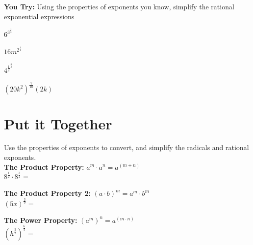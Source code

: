 \documentclass[12pt]{article}
\begin{document}
\hrulefill

\textbf{You Try:} Using the properties of exponents you know, simplify the rational exponential expressions

\begin{enumerate}[resume]
\begin{multicols}{2}

\item $6^{3^{\frac{1}{3}}}$\\

\item $16m^{2^{\frac{1}{4}}}$\\

\item $4^{\frac{1}{2}^{\frac{3}{5}}}$\\

\item $(20k^2)^{\frac{7}{10}}(2k)$\\

\end{multicols}
\end{enumerate}



\section*{Put it Together}
Use the properties of exponents to convert, and simplify the radicals and rational exponents. \\

\textbf{The Product Property:} $a^m\cdot a^n=a^{(m+n)}$\\

\hspace{1in} $8^{\frac{1}{2}} \cdot  8^{\frac{3}{2}}=$\\

\vspace{1cm}

\textbf{The Product Property 2:} $(a\cdot b)^m=a^m\cdot b^m$\\

\hspace{1in}$\left(5x\right)^{\frac{3}{2}}=$\\

\vspace{1cm}

\textbf{The Power Property:} $\left(a^m\right)^{n}=a^{(m\cdot n)}$\\

\hspace{1in} $\left(h^{\frac{5}{7}}\right)^{\frac{6}{5}}=$\\
\end{document}
